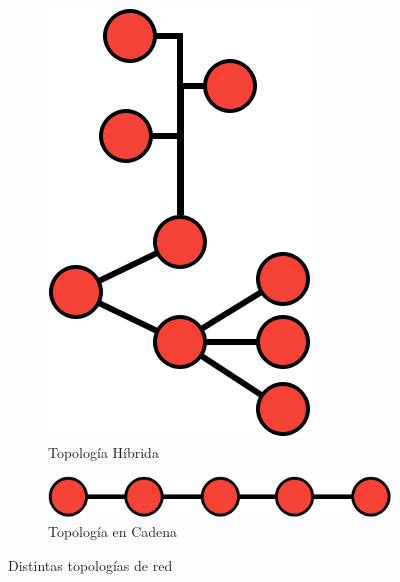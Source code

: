 \documentclass[a4paper, 11pt]{report} %
\begin{document}
\begin{figure}[H]
\begin{subfigure}[p]{0.2\textwidth}
\includegraphics[width=\textwidth]{Resources/Top/Hibrida.png}
\caption{Topología Híbrida}
\end{subfigure}
\begin{subfigure}[p]{0.4\textwidth}
\includegraphics[width=\textwidth]{Resources/Top/Cadena.png}
\caption{Topología en Cadena}
\end{subfigure}
\caption{Distintas topologías de red}
\end{figure}
\end{document}

